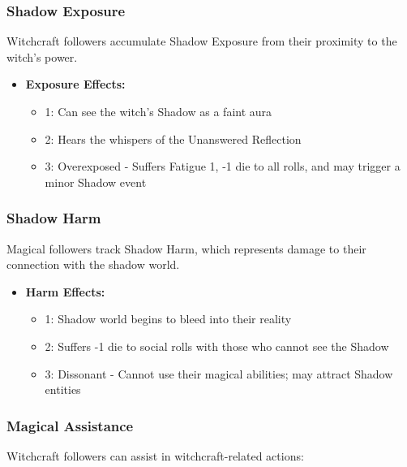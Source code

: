 \subsubsection{Shadow Exposure}
Witchcraft followers accumulate Shadow Exposure from their proximity to the witch's power.

\begin{itemize}
    \item \textbf{Exposure Effects:}
    \begin{itemize}
        \item 1: Can see the witch's Shadow as a faint aura
        \item 2: Hears the whispers of the Unanswered Reflection
        \item 3: Overexposed - Suffers Fatigue 1, -1 die to all rolls, and may trigger a minor Shadow event
    \end{itemize}
\end{itemize}

\subsubsection{Shadow Harm}
Magical followers track Shadow Harm, which represents damage to their connection with the shadow world.

\begin{itemize}
    \item \textbf{Harm Effects:}
    \begin{itemize}
        \item 1: Shadow world begins to bleed into their reality
        \item 2: Suffers -1 die to social rolls with those who cannot see the Shadow
        \item 3: Dissonant - Cannot use their magical abilities; may attract Shadow entities
    \end{itemize}
\end{itemize}

\subsubsection{Magical Assistance}
Witchcraft followers can assist in witchcraft-related actions:

